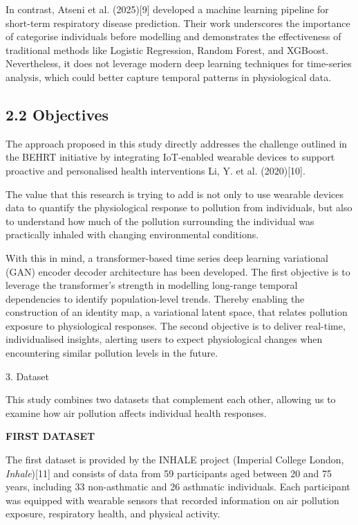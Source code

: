 \documentclass[
]{article}
\begin{document}
In contrast, Atseni et al. (2025){[}9{]} developed a machine learning
pipeline for short-term respiratory disease prediction. Their work
underscores the importance of categorise individuals before modelling
and demonstrates the effectiveness of traditional methods like Logistic
Regression, Random Forest, and XGBoost. Nevertheless, it does not
leverage modern deep learning techniques for time-series analysis, which
could better capture temporal patterns in physiological data.

\hypertarget{objectives}{%
\subsection{2.2 Objectives}\label{objectives}}

The approach proposed in this study directly addresses the challenge
outlined in the BEHRT initiative by integrating IoT-enabled wearable
devices to support proactive and personalised health interventions Li,
Y. et al. (2020){[}10{]}.

The value that this research is trying to add is not only to use
wearable devices data to quantify the physiological response to
pollution from individuals, but also to understand how much of the
pollution surrounding the individual was practically inhaled with
changing environmental conditions.

With this in mind, a transformer-based time series deep learning
variational (GAN) encoder decoder architecture has been developed. The
first objective is to leverage the transformer's strength in modelling
long-range temporal dependencies to identify population-level trends.
Thereby enabling the construction of an identity map, a variational
latent space, that relates pollution exposure to physiological
responses. The second objective is to deliver real-time, individualised
insights, alerting users to expect physiological changes when
encountering similar pollution levels in the future.

\protect\hypertarget{_Toc200353829}{}{}3. Dataset

This study combines two datasets that complement each other, allowing us
to examine how air pollution affects individual health responses.

\textbf{FIRST DATASET}

The first dataset is provided by the INHALE project (Imperial College
London, \emph{Inhale}){[}11{]} and consists of data from 59 participants
aged between 20 and 75 years, including 33 non-asthmatic and 26
asthmatic individuals. Each participant was equipped with wearable
sensors that recorded information on air pollution exposure, respiratory
health, and physical activity.
\end{document}
